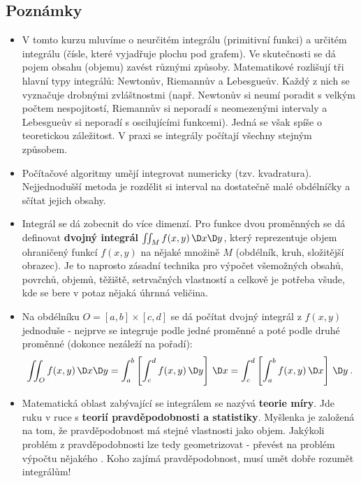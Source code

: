 \subsection*{Poznámky}

\begin{itemize}
    \item V tomto kurzu mluvíme o neurčitém integrálu (primitivní funkci) a určitém integrálu (čísle, které vyjadřuje plochu pod grafem). Ve skutečnosti se dá pojem obsahu (objemu) zavést různými způsoby. Matematikové rozlišují tři hlavní typy integrálů: Newtonův, Riemannův a Lebesgueův. Každý z nich se vyznačuje drobnými zvláštnostmi (např. Newtonův si neumí poradit s velkým počtem nespojitostí, Riemannův si neporadí s neomezenými intervaly a Lebesgueův si neporadí s oscilujícími funkcemi). Jedná se však spíše o teoretickou záležitost. V praxi se integrály počítají všechny stejným způsobem.
    \item Počítačové algoritmy umějí integrovat numericky (tzv. kvadratura). Nejjednodušší metoda je rozdělit si interval na dostatečně malé obdélníčky a sčítat jejich obsahy.
    \item Integrál se dá zobecnit do více dimenzí. Pro funkce dvou proměnných se dá definovat \textbf{dvojný integrál} $\iint_M f(x,y)\, \D x \D y$, který reprezentuje objem ohraničený funkcí $f(x,y)$ na nějaké množině $M$ (obdélník, kruh, složitější obrazec). Je to naprosto zásadní technika pro výpočet všemožných obsahů, povrchů, objemů, těžiště, setrvačných vlastností a celkově je potřeba všude, kde se bere v potaz nějaká úhrnná veličina.
    \item Na obdélníku $O = [a,b] \times [c,d]$ se dá počítat dvojný integrál z $f(x,y)$ jednoduše - nejprve se integruje podle jedné proměnné a poté podle druhé proměnné (dokonce nezáleží na pořadí):
    \begin{align}
        \iint_{O} f(x,y) \, \D x \D y = \int_a^b \left[ \int_c^d f(x,y) \, \D y \right] \, \D x = \int_c^d \left[ \int_a^b f(x,y) \, \D x \right] \, \D y \:.
    \end{align}
    \item Matematická oblast zabývající se integrálem se nazývá \textbf{teorie míry}. Jde ruku v ruce s \textbf{teorií pravděpodobnosti a statistiky}. Myšlenka je založená na tom, že pravděpodobnost má stejné vlastnosti jako objem. Jakýkoli problém z pravděpodobnosti lze tedy geometrizovat - převést na problém výpočtu nějakého . Koho zajímá pravděpodobnost, musí umět dobře rozumět integrálům!
    

\end{itemize}
